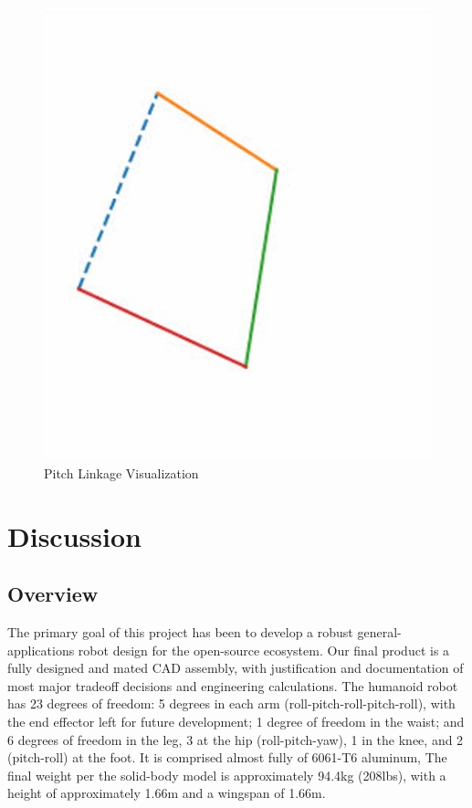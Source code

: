 \documentclass{article}
\begin{document}
\begin{figure}[H]
    \centering
    \includegraphics[scale=0.8]{assets/Design Presentation/Pitch_viz.jpg}
    \caption{Pitch Linkage Visualization}
    \label{fig:enter-label}
\end{figure}

\newpage
\section{Discussion}
\subsection{Overview}
The primary goal of this project has been to develop a robust general-applications robot design for the open-source ecosystem. Our final product is a fully designed and mated CAD assembly, with justification and documentation of most major tradeoff decisions and engineering calculations. The humanoid robot has 23 degrees of freedom: 5 degrees in each arm (roll-pitch-roll-pitch-roll), with the end effector left for future development; 1 degree of freedom in the waist; and 6 degrees of freedom in the leg, 3 at the hip (roll-pitch-yaw), 1 in the knee, and 2 (pitch-roll) at the foot. It is comprised almost fully of 6061-T6 aluminum, The final weight per the solid-body model is approximately 94.4kg (208lbs), with a height of approximately 1.66m and a wingspan of 1.66m. 
\end{document}
